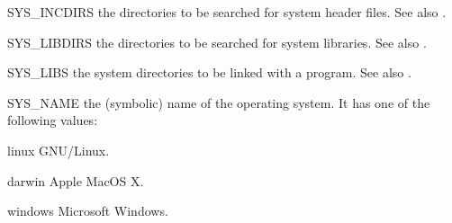 \documentclass[a4paper,10pt]{article}
\begin{document}
\begin{Description}[\Code]
\item[SYS_INCDIRS] \label{makevar:SYS-INCDIRS} the directories to be
  searched for system header files. See also
  \hyperref[makevar:INCDIRS]{}.

\item[SYS_LIBDIRS] \label{makevar:SYS-LIBDIRS} the directories to be
  searched for system libraries. See also
  \hyperref[makevar:LIBDIRS]{}.

\item[SYS_LIBS] \label{makevar:SYS-LIBS} the system directories to be
  linked with a program. See also
  \hyperref[makevar:LIBS]{}.

\item[SYS_NAME] \label{makevar:SYS-NAME} the (symbolic) name of the
  operating system. It has one of the following values:
  \begin{Description}[\Code]

  \item[linux]   GNU/Linux.

  \item[darwin]  Apple MacOS X.

  \item[windows] Microsoft Windows.

  \end{Description}

\end{Description}
\end{document}
